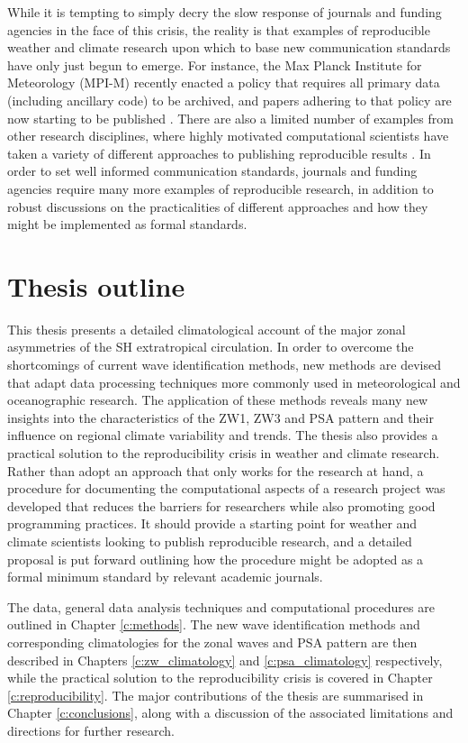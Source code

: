 While it is tempting to simply decry the slow response of journals and funding agencies in the face of this crisis, the reality is that examples of reproducible weather and climate research upon which to base new communication standards have only just begun to emerge. For instance, the Max Planck Institute for Meteorology (MPI-M) recently enacted a policy \citep{Stevens2015a} that requires all primary data (including ancillary code) to be archived, and papers adhering to that policy are now starting to be published \citep[e.g.][]{Stevens2015}. There are also a limited number of examples from other research disciplines, where highly motivated computational scientists have taken a variety of different approaches to publishing reproducible results \citep[e.g.][]{Hanigan2012,Ketcheson2012,Crooks2014,Bremges2015,Schmitt2015}. In order to set well informed communication standards, journals and funding agencies require many more examples of reproducible research, in addition to robust discussions on the practicalities of different approaches and how they might be implemented as formal standards.  



\section{Thesis outline}

This thesis presents a detailed climatological account of the major zonal asymmetries of the SH extratropical circulation. In order to overcome the shortcomings of current wave identification methods, new methods are devised that adapt data processing techniques more commonly used in meteorological and oceanographic research. The application of these methods reveals many new insights into the characteristics of the ZW1, ZW3 and PSA pattern and their influence on regional climate variability and trends. The thesis also provides a practical solution to the reproducibility crisis in weather and climate research. Rather than adopt an approach that only works for the research at hand, a procedure for documenting the computational aspects of a research project was developed that reduces the barriers for researchers while also promoting good programming practices. It should provide a starting point for weather and climate scientists looking to publish reproducible research, and a detailed proposal is put forward outlining how the procedure might be adopted as a formal minimum standard by relevant academic journals.

The data, general data analysis techniques and computational procedures are outlined in Chapter \ref{c:methods}. The new wave identification methods and corresponding climatologies for the zonal waves and PSA pattern are then described in Chapters \ref{c:zw_climatology} and \ref{c:psa_climatology} respectively, while the practical solution to the reproducibility crisis is covered in Chapter \ref{c:reproducibility}. The major contributions of the thesis are summarised in Chapter \ref{c:conclusions}, along with a discussion of the associated limitations and directions for further research.